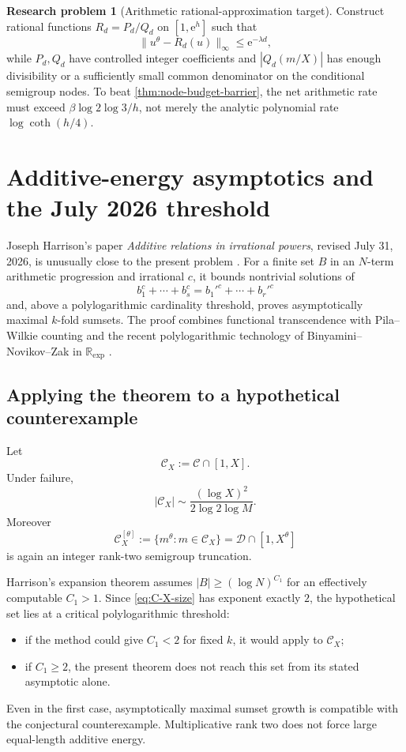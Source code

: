 \documentclass[11pt,oneside]{article}
\theoremstyle{definition}
\newtheorem{problem}[theorem]{Research problem}
\theoremstyle{remark}
\newcommand{\R}{\mathbb R}
\newcommand{\Cand}{\mathcal C}
\newcommand{\Out}{\mathcal D}
\newcommand{\e}{\mathrm e}
\begin{document}
\begin{problem}[Arithmetic rational-approximation target]
Construct rational functions $R_d=P_d/Q_d$ on $[1,\e^h]$ such that
\[
 \|u^\theta-R_d(u)\|_\infty\le\e^{-\lambda d},
\]
while $P_d,Q_d$ have controlled integer coefficients and $|Q_d(m/X)|$ has enough divisibility or a sufficiently small common denominator on the conditional semigroup nodes.  To beat \cref{thm:node-budget-barrier}, the net arithmetic rate must exceed $\beta\log2\log3/h$, not merely the analytic polynomial rate $\log\coth(h/4)$.
\end{problem}

\section{Additive-energy asymptotics and the July 2026 threshold}
\label{sec:additive}

Joseph Harrison's paper \emph{Additive relations in irrational powers}, revised July 31, 2026, is unusually close to the present problem \cite{Harrison2026}.  For a finite set $B$ in an $N$-term arithmetic progression and irrational $c$, it bounds nontrivial solutions of
\[
  b_1^c+\cdots+b_s^c=b_1'^c+\cdots+b_r'^c
\]
and, above a polylogarithmic cardinality threshold, proves asymptotically maximal $k$-fold sumsets.  The proof combines functional transcendence with Pila--Wilkie counting and the recent polylogarithmic technology of Binyamini--Novikov--Zak in $\R_{\exp}$ \cite{PilaWilkie2006,BinyaminiNovikovZak}.

\subsection{Applying the theorem to a hypothetical counterexample}

Let
\[
  \Cand_X:=\Cand\cap[1,X].
\]
Under failure,
\begin{equation}
  |\Cand_X|
  \sim\frac{(\log X)^2}{2\log2\log M}.
  \label{eq:C-X-size}
\end{equation}
Moreover
\[
  \Cand_X^{[\theta]}
  :=\{m^\theta:m\in\Cand_X\}
  =\Out\cap[1,X^\theta]
\]
is again an integer rank-two semigroup truncation.

Harrison's expansion theorem assumes $|B|\ge(\log N)^{C_1}$ for an effectively computable $C_1>1$.  Since \eqref{eq:C-X-size} has exponent exactly $2$, the hypothetical set lies at a critical polylogarithmic threshold:
\begin{itemize}
  \item if the method could give $C_1<2$ for fixed $k$, it would apply to $\Cand_X$;
  \item if $C_1\ge2$, the present theorem does not reach this set from its stated asymptotic alone.
\end{itemize}
Even in the first case, asymptotically maximal sumset growth is compatible with the conjectural counterexample.  Multiplicative rank two does not force large equal-length additive energy.
\end{document}
